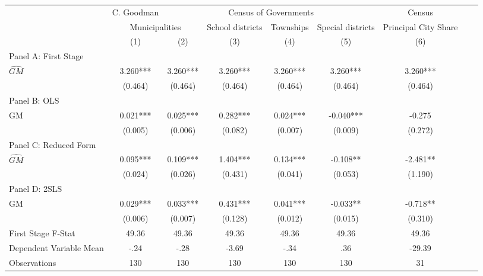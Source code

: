 \begin{tabular}{l*{8}{c}} \toprule
&\multicolumn{1}{c}{C. Goodman}&\multicolumn{4}{c}{Census of Governments}&\multicolumn{1}{c}{Census}\\\cmidrule(lr){2-2}\cmidrule(lr){3-6}\cmidrule(lr){7-7}
&\multicolumn{2}{c}{Municipalities}&\multicolumn{1}{c}{School districts}&\multicolumn{1}{c}{Townships}&\multicolumn{1}{c}{Special districts}&\multicolumn{1}{c}{Principal City Share}\\\cmidrule(lr){2-3}\cmidrule(lr){4-6}\cmidrule(lr){7-7}
&\multicolumn{1}{c}{(1)}&\multicolumn{1}{c}{(2)}&\multicolumn{1}{c}{(3)}&\multicolumn{1}{c}{(4)}&\multicolumn{1}{c}{(5)}&\multicolumn{1}{c}{(6)}\\
\cmidrule(lr){1-7}
\multicolumn{6}{l}{Panel A: First Stage}\\
\cmidrule(lr){1-7}
$\widehat{GM}$  &    3.260***&    3.260***&    3.260***&    3.260***&    3.260***&    3.260***\\
                &  (0.464)   &  (0.464)   &  (0.464)   &  (0.464)   &  (0.464)   &  (0.464)   \\
\cmidrule(lr){1-7}
\multicolumn{6}{l}{Panel B: OLS}\\
\cmidrule(lr){1-7}
GM              &    0.021***&    0.025***&    0.282***&    0.024***&   -0.040***&   -0.275   \\
                &  (0.005)   &  (0.006)   &  (0.082)   &  (0.007)   &  (0.009)   &  (0.272)   \\
\cmidrule(lr){1-7}
\multicolumn{6}{l}{Panel C: Reduced Form}\\
\cmidrule(lr){1-7}
$\widehat{GM}$  &    0.095***&    0.109***&    1.404***&    0.134***&   -0.108** &   -2.481** \\
                &  (0.024)   &  (0.026)   &  (0.431)   &  (0.041)   &  (0.053)   &  (1.190)   \\
\cmidrule(lr){1-7}
\multicolumn{6}{l}{Panel D: 2SLS}\\
\cmidrule(lr){1-7}
GM              &    0.029***&    0.033***&    0.431***&    0.041***&   -0.033** &   -0.718** \\
                &  (0.006)   &  (0.007)   &  (0.128)   &  (0.012)   &  (0.015)   &  (0.310)   \\
\midrule
First Stage F-Stat&    49.36   &    49.36   &    49.36   &    49.36   &    49.36   &    49.36   \\
Dependent Variable Mean&     -.24   &     -.28   &    -3.69   &     -.34   &      .36   &   -29.39   \\
Observations    &      130   &      130   &      130   &      130   &      130   &       31   \\
       \bottomrule \end{tabular}
